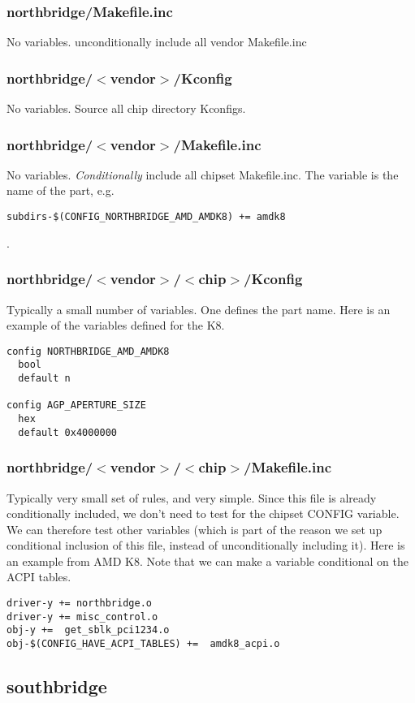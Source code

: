 \documentclass[10pt,letterpaper]{article}
\begin{document}
\subsubsection{northbridge/Makefile.inc}
No variables. unconditionally include all vendor Makefile.inc
\subsubsection{northbridge/$<$vendor$>$/Kconfig}
No variables. Source all chip directory Kconfigs.
\subsubsection{northbridge/$<$vendor$>$/Makefile.inc}
No variables. {\em Conditionally} include all chipset Makefile.inc. The variable
is the name of the part, e.g.
\begin{verbatim}
subdirs-$(CONFIG_NORTHBRIDGE_AMD_AMDK8) += amdk8
\end{verbatim}
.
\subsubsection{northbridge/$<$vendor$>$/$<$chip$>$/Kconfig}
Typically a small number of variables. One defines the part name. Here is an example
of the variables defined for the K8.
\begin{verbatim}
config NORTHBRIDGE_AMD_AMDK8
  bool
  default n

config AGP_APERTURE_SIZE
  hex
  default 0x4000000
\end{verbatim}
\subsubsection{northbridge/$<$vendor$>$/$<$chip$>$/Makefile.inc}
Typically very small set of rules, and very simple.
Since this file is already conditionally included,
we don't need to test for the chipset CONFIG variable. We
can therefore test other variables (which is part of the reason
we set up conditional inclusion of this file, instead
of unconditionally including it). Here is an example from AMD K8.
Note that we can make a variable conditional on the ACPI tables.
\begin{verbatim}
driver-y += northbridge.o
driver-y += misc_control.o
obj-y +=  get_sblk_pci1234.o
obj-$(CONFIG_HAVE_ACPI_TABLES) +=  amdk8_acpi.o
\end{verbatim}

\subsection{southbridge}
\end{document}
